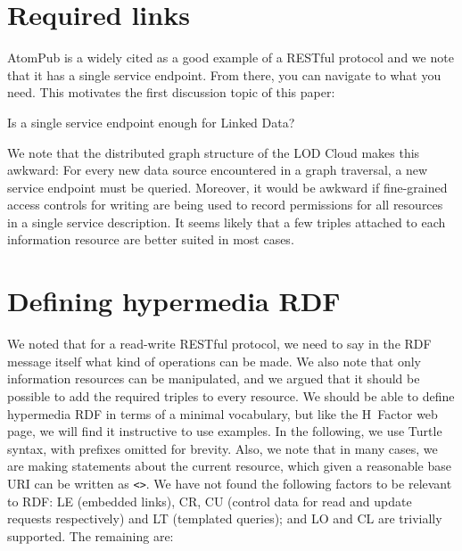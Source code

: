 \documentclass{llncs}
\begin{document}
\section{Required links}

AtomPub %
is a widely cited as a good example of a RESTful protocol and
we note that it has a single service endpoint. From there, you can
navigate to what you need. This motivates the first discussion topic
of this paper:

\begin{question}
Is a single service endpoint enough for Linked Data?
\end{question}

We note that the distributed graph structure of the LOD Cloud makes
this awkward: For every new data source encountered in a graph
traversal, a new service endpoint must be queried. Moreover, it would
be awkward if fine-grained access controls for writing are being used
to record permissions for all resources in a single service
description. It seems likely that a few triples attached to each
information resource are better suited in most cases.

\section{Defining hypermedia RDF}

We noted that for a read-write RESTful protocol, we need to say in the
RDF message itself what kind of operations can be made. We also note
that only information resources can be manipulated, and we argued that
it should be possible to add the required triples to every
resource. We should be able to define hypermedia RDF in terms of a
minimal vocabulary, but like the H~Factor web page, we will find it
instructive to use examples. In the following, we use Turtle syntax,
with prefixes omitted for brevity. Also, we note that in many cases,
we are making statements about the current resource, which given a
reasonable base URI can be written as \texttt{<>}. We have not found
the following factors to be relevant to RDF: \textsf{LE} (embedded
links), \textsf{CR}, \textsf{CU} (control data for read and update
requests respectively) and \textsf{LT} (templated queries); and
\textsf{LO} and \textsf{CL} are trivially supported. The remaining
are:
\end{document}
